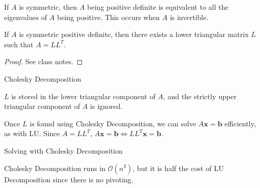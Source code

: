 \begin{marginfigure}
	If $A$ is symmetric, then $A$ being positive definite is equivalent to all the eigenvalues of $A$ being positive. This occurs when $A$ is invertible.
\end{marginfigure}

\begin{thm}
	If $A$ is symmetric positive definite, then there exists a lower triangular matrix $L$ such that $A = L L^T$.
\end{thm}

\begin{proof}
	See class notes.
\end{proof}

\begin{algorithm}
	  \caption{Cholesky Decomposition}\label{cholesky}
\end{algorithm}

\begin{rmk}
	$L$ is stored in the lower triangular component of $A$, and the strictly upper triangular component of $A$ is ignored.
\end{rmk}

\NewLine

\noindent Once $L$ is found using Cholesky Decomposition, we can solve $A \mathbf{x} = \mathbf{b}$ efficiently, as with LU. Since $A = L L^T$, $A \mathbf{x} = \mathbf{b} \iff L L^T \mathbf{x} = \mathbf{b}$.

\begin{algorithm}
	  \caption{Solving with Cholesky Decomposition}\label{CholeskySolve}
\end{algorithm}

\begin{rmk}
	Cholesky Decomposition runs in $\mathcal{O}(n^3)$, but it is half the cost of LU Decomposition since there is no pivoting.
\end{rmk}